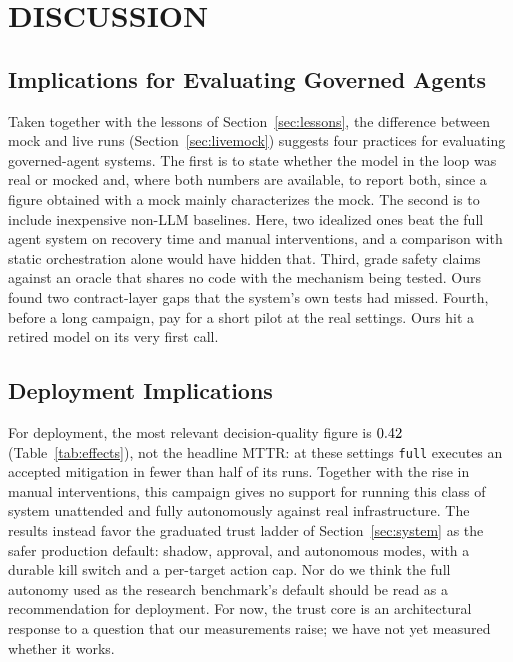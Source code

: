 \section{DISCUSSION}\label{sec:discussion}

\subsection{Implications for Evaluating Governed Agents}
Taken together with the lessons of Section~\ref{sec:lessons}, the difference between mock and live
runs (Section~\ref{sec:livemock}) suggests four practices for evaluating governed-agent systems. The
first is to state whether the model in the loop was real or mocked and, where both numbers are
available, to report both, since a figure obtained with a mock mainly characterizes the mock. The
second is to include inexpensive non-LLM baselines. Here, two idealized ones beat the full agent system on recovery time and manual
interventions, and a comparison with static orchestration alone would have hidden that. Third, grade
safety claims against an oracle that shares no code with the mechanism being tested. Ours found two
contract-layer gaps that the system's own tests had missed. Fourth, before a long campaign, pay for a
short pilot at the real settings. Ours hit a retired model on its very first call.

\subsection{Deployment Implications}
For deployment, the most relevant decision-quality figure is $0.42{}$
(Table~\ref{tab:effects}), not the
headline MTTR: at these settings \texttt{full} executes an accepted mitigation in fewer than half of
its runs. Together with the rise in manual interventions, this campaign gives no support for running
this class of system unattended and fully autonomously against real infrastructure. The results
instead favor the graduated trust ladder of Section~\ref{sec:system} as the safer production
default: shadow, approval, and autonomous modes, with a durable kill switch and a per-target action
cap. Nor do we think the full autonomy used as the research benchmark's default should be read as a
recommendation for deployment. For now, the trust core is an architectural response to a question that
our measurements raise; we have not yet measured whether it works.

